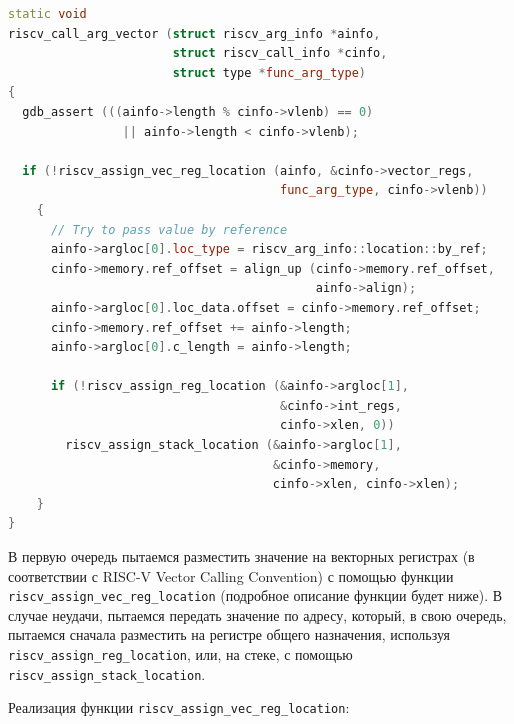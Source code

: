 \begin{samepage}
\begin{lstlisting}[language=C++, caption=Функция для определения способа передачи значения аргумента, 
	           label=lst:func:riscv_call_arg_vector, breaklines=false]
static void
riscv_call_arg_vector (struct riscv_arg_info *ainfo,
                       struct riscv_call_info *cinfo,
                       struct type *func_arg_type)
{
  gdb_assert (((ainfo->length % cinfo->vlenb) == 0)
                || ainfo->length < cinfo->vlenb);

  if (!riscv_assign_vec_reg_location (ainfo, &cinfo->vector_regs,
                                      func_arg_type, cinfo->vlenb))
    {
      // Try to pass value by reference
      ainfo->argloc[0].loc_type = riscv_arg_info::location::by_ref;
      cinfo->memory.ref_offset = align_up (cinfo->memory.ref_offset, 
                                           ainfo->align);
      ainfo->argloc[0].loc_data.offset = cinfo->memory.ref_offset;
      cinfo->memory.ref_offset += ainfo->length;
      ainfo->argloc[0].c_length = ainfo->length;

      if (!riscv_assign_reg_location (&ainfo->argloc[1], 
                                      &cinfo->int_regs, 
                                      cinfo->xlen, 0))
        riscv_assign_stack_location (&ainfo->argloc[1], 
                                     &cinfo->memory,
                                     cinfo->xlen, cinfo->xlen);
    }
}
\end{lstlisting}
\end{samepage}

В первую очередь пытаемся разместить значение на векторных регистрах (в соответствии с RISC-V Vector
Calling Convention) с помощью функции \texttt{riscv\_assign\_vec\_reg\_location} (подробное описание
функции будет ниже). В случае неудачи, пытаемся передать значение по адресу, который, в свою очередь,
пытаемся сначала разместить на регистре общего назначения, используя  \texttt{riscv\_assign\_reg\_location}, 
или, на стеке, с помощью \texttt{riscv\_assign\_stack\_location}.

Реализация функции \texttt{riscv\_assign\_vec\_reg\_location}:


